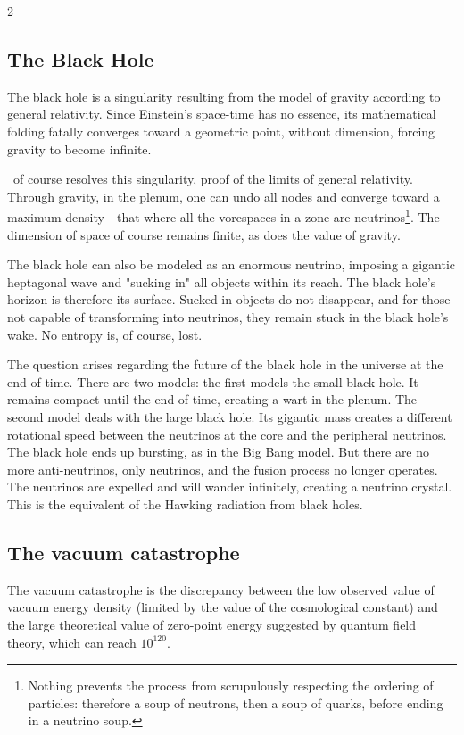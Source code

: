 \begin{multicols}{2}
	\subsection{The Black Hole}
	
	The black hole is a singularity resulting from the model of gravity according to general relativity. Since Einstein's space-time has no essence, its mathematical folding fatally converges toward a geometric point, without dimension, forcing gravity to become infinite.
	
	\PQ\ of course resolves this singularity, proof of the limits of general relativity. Through gravity, in the plenum, one can undo all nodes and converge toward a maximum density—that where all the vorespaces in a zone are neutrinos\footnote{Nothing prevents the process from scrupulously respecting the ordering of particles: therefore a soup of neutrons, then a soup of quarks, before ending in a neutrino soup.}. The dimension of space of course remains finite, as does the value of gravity.
	
	The black hole can also be modeled as an enormous neutrino, imposing a gigantic heptagonal wave and "sucking in" all objects within its reach. The black hole's horizon is therefore its surface. Sucked-in objects do not disappear, and for those not capable of transforming into neutrinos, they remain stuck in the black hole's wake. No entropy is, of course, lost.
	
	The question arises regarding the future of the black hole in the universe at the end of time. There are two models: the first models the small black hole. It remains compact until the end of time, creating a wart in the plenum. The second model deals with the large black hole. Its gigantic mass creates a different rotational speed between the neutrinos at the core and the peripheral neutrinos. The black hole ends up bursting, as in the Big Bang model. But there are no more anti-neutrinos, only neutrinos, and the fusion process no longer operates. The neutrinos are expelled and will wander infinitely, creating a neutrino crystal. This is the equivalent of the Hawking radiation from black holes.\cite{hawking1975particle}
	
	\subsection{The vacuum catastrophe}
	
	The vacuum catastrophe is the discrepancy between the low observed value of vacuum energy density (limited by the value of the cosmological constant) and the large theoretical value of zero-point energy suggested by quantum field theory, which can reach $10^{120}$.
	

\end{multicols}
